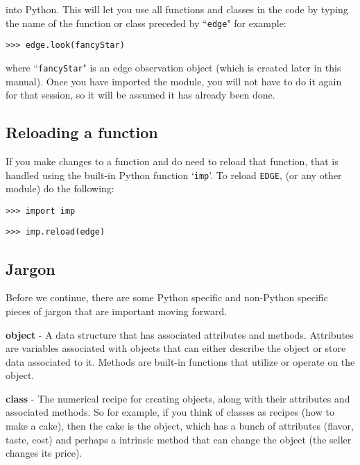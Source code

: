 \documentclass{article}
\begin{document}
\noindent into Python. This will let you use all functions and classes in the code by typing the name of the function or class preceded by ``\texttt{edge}" for example: 

\vspace{2mm} 
\texttt{>>> edge.look(fancyStar)}
\vspace{2mm}

\noindent where ``\texttt{fancyStar}" is an edge observation object (which is created later in this manual). Once you have imported the module, you will not have to do it again for that session, so it will be assumed it has already been done. 


\subsection{Reloading a function}

If you make changes to a function and do need to reload that function, that is handled using the built-in Python function `\texttt{imp}'. To reload \texttt{EDGE}, (or any other module) do the following:

\vspace{2mm}
\texttt{>>> import imp}

\texttt{>>> imp.reload(edge)}
\vspace{2mm}

\subsection{Jargon}  
 
Before we continue, there are some Python specific and non-Python specific pieces of jargon that are important moving forward.
 
\vspace{2mm}

\noindent \textbf{object} - A data structure that has associated attributes and methods. Attributes are variables associated with objects that can either describe the object or store data associated to it. Methods are built-in functions that utilize or operate on the object.

\noindent \textbf{class} - The numerical recipe for creating objects, along with their attributes and associated methods. So for example, if you think of classes as recipes (how to make a cake), then the cake is the object, which has a bunch of attributes (flavor, taste, cost) and perhaps a intrinsic method that can change the object (the seller changes its price).
\end{document}
